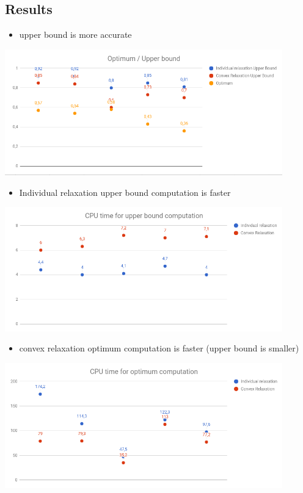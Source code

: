 \documentclass{beamer}
\begin{document}
\subsection{Results}

\begin{frame}
\begin{itemize}
	\item upper bound is more accurate
\end{itemize}
\hspace*{-0.8cm}
\includegraphics[width=12cm]{media/optimum_upperbound.png}
\end{frame}


\begin{frame}
\begin{itemize}
	\item Individual relaxation upper bound computation is faster
\end{itemize}
\hspace*{-0.8cm}
\includegraphics[width=12cm]{media/cpu_upper.png}
\end{frame}
	

\begin{frame}
\begin{itemize}
	\item convex relaxation optimum computation is faster (upper bound is smaller)
\end{itemize}
\hspace*{-0.8cm}
\includegraphics[width=12cm]{media/cpu_opt.png}
\end{frame}
\end{document}
